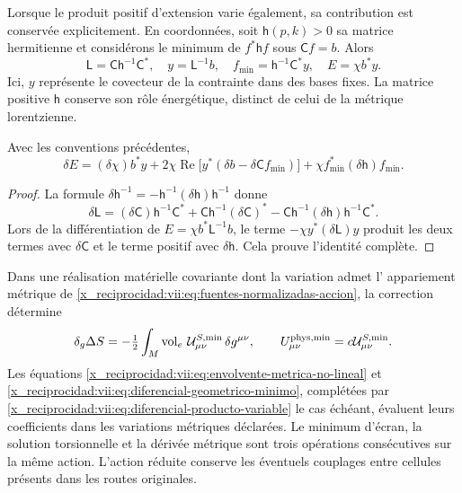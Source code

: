 Lorsque le produit positif d'extension varie également, sa
contribution est conservée explicitement. En coordonnées, soit
\(\mathsf h(p,k)>0\) sa matrice hermitienne et considérons le minimum
de \(f^*\mathsf h f\) sous \(\mathsf C f=b\). Alors
\begin{equation}
 \mathsf L=\mathsf C\mathsf h^{-1}\mathsf C^*,\quad
 y=\mathsf L^{-1}b,\quad
 f_{\min}=\mathsf h^{-1}\mathsf C^*y,\quad
 E=\chi b^*y.
 \label{x_reciprocidad:vii:eq:minimo-producto-variable}
\end{equation}
Ici, \(y\) représente le covecteur de la contrainte dans des bases fixes. La matrice positive \(\mathsf h\) conserve son rôle énergétique, distinct de celui de la métrique lorentzienne.

\begin{lemma}
\label{x_reciprocidad:vii:lem:producto-variable-extension}
Avec les conventions précédentes,
\begin{equation}
 \delta E=(\delta\chi)b^*y
   +2\chi\operatorname{Re}\bigl[y^*(\delta b-\delta\mathsf C f_{\min})\bigr]
   +\chi f_{\min}^*(\delta\mathsf h)f_{\min}.
 \label{x_reciprocidad:vii:eq:diferencial-producto-variable}
\end{equation}
\end{lemma}
\begin{proof}
La formule \(\delta\mathsf h^{-1}
=-\mathsf h^{-1}(\delta\mathsf h)\mathsf h^{-1}\) donne
\[
 \delta\mathsf L=(\delta\mathsf C)\mathsf h^{-1}\mathsf C^*
 +\mathsf C\mathsf h^{-1}(\delta\mathsf C)^*
 -\mathsf C\mathsf h^{-1}(\delta\mathsf h)
                              \mathsf h^{-1}\mathsf C^*.
\]
Lors de la différentiation de \(E=\chi b^*\mathsf L^{-1}b\), le terme \(-\chi y^*(\delta\mathsf L)y\) produit les deux termes avec \(\delta\mathsf C\) et le terme positif avec \(\delta\mathsf h\). Cela prouve l'identité complète.
\end{proof}

Dans une réalisation matérielle covariante dont la variation admet l'
appariement métrique de
\eqref{x_reciprocidad:vii:eq:fuentes-normalizadas-accion}, la correction détermine
\begin{equation}
 \delta_g\Delta S
 =-\tfrac12\int_M\operatorname{vol}_e\,
          \mathcal U^{S,\min}_{\mu\nu}\,\delta g^{\mu\nu},
 \qquad U^{\rm phys,\min}_{\mu\nu}
                      =c\mathcal U^{S,\min}_{\mu\nu}.
 \label{x_reciprocidad:vii:eq:fuente-metrica-minimo-no-lineal}
\end{equation}
Les équations \eqref{x_reciprocidad:vii:eq:envolvente-metrica-no-lineal} et
\eqref{x_reciprocidad:vii:eq:diferencial-geometrico-minimo}, complétées par
\eqref{x_reciprocidad:vii:eq:diferencial-producto-variable} le cas échéant,
évaluent leurs coefficients dans les variations métriques déclarées.
Le minimum d'écran, la solution torsionnelle et la dérivée métrique
sont trois opérations consécutives sur la même action.
L'action réduite conserve les éventuels couplages entre
cellules présents dans les routes originales.

